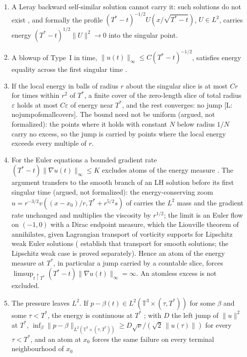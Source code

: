 \documentclass[letterpaper,twocolumn]{article}
\newcommand{\lean}[1]{{\footnotesize\def\_{\textunderscore\allowbreak}%
\hspace{0pt}[L: {\ttfamily\fontdimen3\font=2pt\fontdimen4\font=1pt #1}]}}
\newcommand{\T}{\mathbb{T}}
\begin{document}
\begin{enumerate}
\item A Leray backward self-similar solution cannot carry it: such
solutions do not exist \cite{NecRuzSve96,Tsa98}, and formally the profile
$(T^*-t)^{-1/2}U(x/\sqrt{T^*-t})$, $U \in L^2$, carries energy
$(T^*-t)^{1/2}\|U\|^2 \to 0$ into the singular point.
\item A blowup of Type~I in time, $\|u(t)\|_\infty \leq C(T^*-t)^{-1/2}$,
satisfies energy equality across the first singular time
\cite{LesShv18,CheLuo20}.
\item If the local energy in balls of radius $r$ about the singular slice
is at most $Cr$ for times within $r^2$ of $T^*$, a finite cover of the
zero-length slice of total radius $\varepsilon$ holds at most
$C\varepsilon$ of energy near $T^*$, and the rest converges: no jump
\lean{no\_jump\_of\_small\_covers}. The bound need not be uniform
(argued, not formalized): the points where it holds with constant $N$
below radius $1/N$ carry no excess, so the jump is carried by points
where the local energy exceeds every multiple of $r$.
\item For the Euler equations a bounded gradient rate
$(T^*-t)\|\nabla u(t)\|_\infty \leq K$ excludes atoms of the energy
measure \cite{ChaWol20}. The argument transfers to the smooth branch of
an LH solution before its first singular time (argued, not formalized):
the energy-conserving zoom $u = r^{-3/2}v((x-x_0)/r, T^* + r^{5/2}s)$ of
\cite{Ser24} carries the $L^2$ mass and the gradient rate unchanged and
multiplies the viscosity by $r^{1/2}$; the limit is an Euler flow on
$(-1,0)$ with a Dirac endpoint measure, which the Liouville theorem of
\cite{ChaWol20} annihilates, given Lagrangian transport of vorticity
supports for Lipschitz weak Euler solutions (\cite{ChaWol20} establish
that transport for smooth solutions; the Lipschitz weak case is proved
separately). Hence an atom of the energy measure at $T^*$, in
particular a jump carried by a countable slice, forces
$\limsup_{t\uparrow T^*}(T^*-t)\|\nabla u(t)\|_\infty = \infty$. An
atomless excess is not excluded.
\item The pressure leaves $L^2$. If $p - \beta(t) \in L^2(\T^3 \times
(\tau,T^*))$ for some $\beta$ and some $\tau < T^*$, the energy is
continuous at $T^*$ \cite{Kuk06}; with $D$ the left jump of $\|u\|^2$ at
$T^*$, $\inf_\beta\|p-\beta\|_{L^2(\T^3\times(\tau,T^*))} \geq
D\sqrt{\nu}/(\sqrt{2}\,\|u(\tau)\|)$ for every $\tau < T^*$, and an atom
at $x_0$ forces the same failure on every terminal neighbourhood of $x_0$

\end{enumerate}
\end{document}
